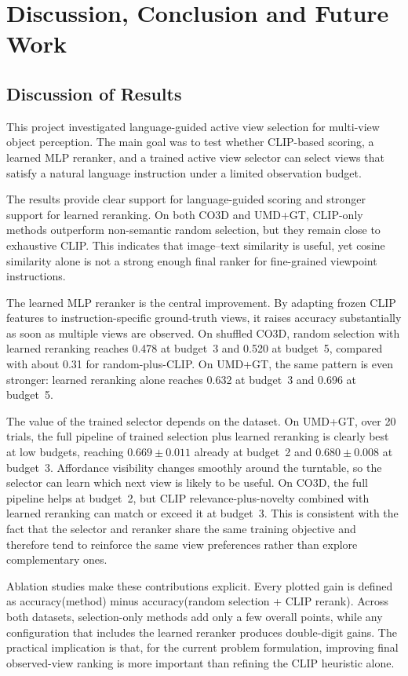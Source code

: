 \chapter{Discussion, Conclusion and Future Work}
\label{chap:conclusion}

\section{Discussion of Results}

This project investigated language-guided active view selection for multi-view object perception. The main goal was to test whether CLIP-based scoring, a learned MLP reranker, and a trained active view selector can select views that satisfy a natural language instruction under a limited observation budget.

The results provide clear support for language-guided scoring and stronger support for learned reranking. On both CO3D and UMD+GT, CLIP-only methods outperform non-semantic random selection, but they remain close to exhaustive CLIP. This indicates that image--text similarity is useful, yet cosine similarity alone is not a strong enough final ranker for fine-grained viewpoint instructions.

The learned MLP reranker is the central improvement. By adapting frozen CLIP features to instruction-specific ground-truth views, it raises accuracy substantially as soon as multiple views are observed. On shuffled CO3D, random selection with learned reranking reaches 0.478 at budget~3 and 0.520 at budget~5, compared with about 0.31 for random-plus-CLIP. On UMD+GT, the same pattern is even stronger: learned reranking alone reaches 0.632 at budget~3 and 0.696 at budget~5.

The value of the trained selector depends on the dataset. On UMD+GT, over 20 trials, the full pipeline of trained selection plus learned reranking is clearly best at low budgets, reaching \(0.669\pm0.011\) already at budget~2 and \(0.680\pm0.008\) at budget~3. Affordance visibility changes smoothly around the turntable, so the selector can learn which next view is likely to be useful. On CO3D, the full pipeline helps at budget~2, but CLIP relevance-plus-novelty combined with learned reranking can match or exceed it at budget~3. This is consistent with the fact that the selector and reranker share the same training objective and therefore tend to reinforce the same view preferences rather than explore complementary ones.

Ablation studies make these contributions explicit. Every plotted gain is defined as accuracy(method) minus accuracy(random selection + CLIP rerank). Across both datasets, selection-only methods add only a few overall points, while any configuration that includes the learned reranker produces double-digit gains. The practical implication is that, for the current problem formulation, improving final observed-view ranking is more important than refining the CLIP heuristic alone.


